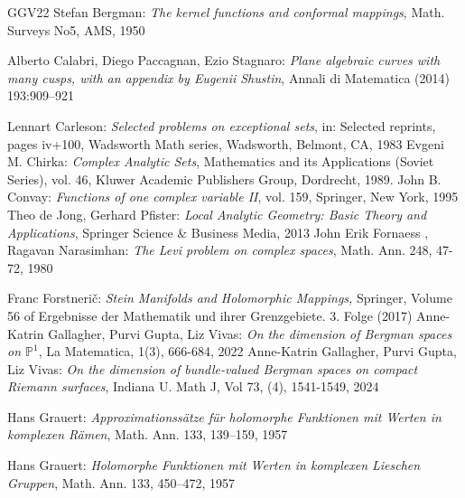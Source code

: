 \documentclass[11pt]{amsart}
\theoremstyle{definition}
\begin{document}
\begin{thebibliography}{GGV22}
Stefan Bergman: 
\emph{The kernel functions and conformal mappings}, Math. Surveys No5, AMS, 1950


 Alberto Calabri, Diego Paccagnan, Ezio Stagnaro: \emph{Plane algebraic curves with many cusps,
with an appendix by Eugenii Shustin}, Annali di Matematica (2014) 193:909–921

Lennart Carleson:
\emph{Selected problems on exceptional sets},
in: Selected reprints, pages iv+100, Wadsworth Math series,
Wadsworth, Belmont, CA, 1983
Evgeni M.  Chirka: 
\emph{Complex Analytic Sets}, Mathematics and its Applications (Soviet Series), vol. 46, Kluwer Academic Publishers Group, Dordrecht, 1989.
John B. Convay: 
\emph{Functions of one complex variable II}, vol. 159,
Springer, New York, 1995
 Theo de Jong, Gerhard Pfister: \emph{Local Analytic Geometry: Basic Theory and Applications}, Springer Science \& Business Media, 2013
John Erik Fornaess , Ragavan Narasimhan: 
\emph{The Levi problem on complex spaces},
Math. Ann. 248, 47-72, 1980

Franc Forstnerič:  \emph{Stein Manifolds and Holomorphic Mappings,} Springer, Volume 56 of Ergebnisse der Mathematik und ihrer Grenzgebiete. 3. Folge (2017)
Anne-Katrin Gallagher, Purvi  Gupta,  Liz Vivas:
\emph{On the dimension of Bergman spaces on $\mathbb P^1$},
La Matematica, 1(3), 666-684, 2022
Anne-Katrin Gallagher, Purvi  Gupta,  Liz Vivas: 
\emph{On the dimension of bundle-valued Bergman spaces on compact Riemann surfaces}, Indiana U. Math J, Vol 73, (4), 1541-1549, 2024

 Hans Grauert:  \emph{Approximationssätze für holomorphe Funktionen mit Werten in komplexen Rämen}, Math. Ann. 133, 139–159, 1957

 Hans Grauert:  \emph{Holomorphe Funktionen mit Werten in komplexen Lieschen Gruppen}, Math.
Ann. 133, 450–472, 1957


\end{thebibliography}
\end{document}

